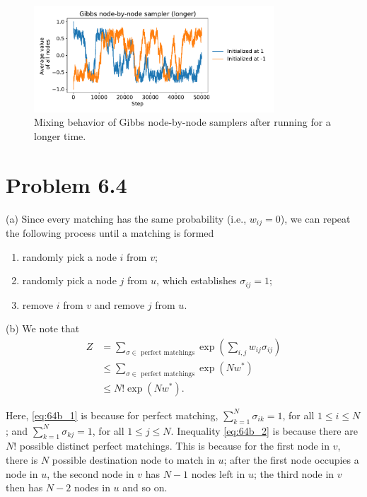 \documentclass{article}
\begin{document}
\begin{figure}[h]
\centering
\includegraphics[width=0.8\textwidth]{./computational/gibbs_node_sampler_mixing_longer.pdf}
\vspace{-0.6cm}
\caption{Mixing behavior of Gibbs node-by-node samplers after running for a longer time.}
\label{f:63f}
\end{figure}

\pagebreak


\section*{Problem 6.4}
(a) Since every matching has the same probability (i.e., $w_{ij} = 0$), we can repeat
the following process until a matching is formed
\begin{enumerate}
	\item randomly pick a node $i$ from $v$;
	\item randomly pick a node $j$ from $u$, which establishes $\sigma_{ij}=1$;
	\item remove $i$ from $v$ and remove $j$ from $u$.\\
\end{enumerate}

\noindent
(b) We note that
\begin{align}
	Z &= \sum_{\sigma\in\text{ perfect matchings}} \exp\left(\sum_{i,j}w_{ij}\sigma_{ij}\right)\\
	&\leq \sum_{\sigma\in\text{ perfect matchings}} \exp\left(Nw^*\right) \label{eq:64b_1}\\
	&\leq N!\exp\left(Nw^*\right) \label{eq:64b_2}.
\end{align}

Here, \eqref{eq:64b_1} is because for perfect matching,
$\sum_{k=1}^N \sigma_{ik} = 1$, for all $1\leq i \leq N$; and
$\sum_{k=1}^N \sigma_{kj} = 1$, for all $1\leq j \leq N$.
Inequality \eqref{eq:64b_2} is because there are $N!$ possible
distinct perfect matchings. This is because for the first node in $v$,
there is $N$ possible destination node to match in $u$;
after the first node occupies a node in $u$, the second node in $v$ has $N-1$ nodes
left in $u$;
the third node in $v$ then has $N-2$ nodes in $u$ and so on.
\end{document}
